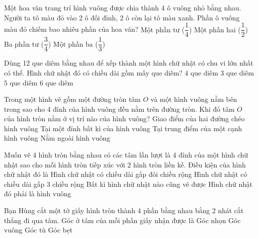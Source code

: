 \begin{ex} %
Một hoa văn trang trí hình vuông được chia thành 4 ô vuông nhỏ bằng nhau. Người ta tô màu đỏ vào 2 ô đối đỉnh, 2 ô còn lại tô màu xanh. Phần ô vuông màu đỏ chiếm bao nhiêu phần của hoa văn?
\choice
{Một phần tư ($\dfrac{1}{4}$)}
{\True Một phần hai ($\dfrac{1}{2}$)}
{Ba phần tư ($\dfrac{3}{4}$)}
{Một phần ba ($\dfrac{1}{3}$)}
\end{ex}

\begin{ex} %
Dùng 12 que diêm bằng nhau để xếp thành một hình chữ nhật có chu vi lớn nhất có thể. Hình chữ nhật đó có chiều dài gồm mấy que diêm?
\choice
{$4$ que diêm}
{$3$ que diêm}
{\True $5$ que diêm}
{$6$ que diêm}
\end{ex}

\begin{ex} %
Trong một hình vẽ gồm một đường tròn tâm $O$ và một hình vuông nằm bên trong sao cho 4 đỉnh của hình vuông đều nằm trên đường tròn. Khi đó tâm $O$ của hình tròn nằm ở vị trí nào của hình vuông?
\choice
{\True Giao điểm của hai đường chéo hình vuông}
{Tại một đỉnh bất kì của hình vuông}
{Tại trung điểm của một cạnh hình vuông}
{Nằm ngoài hình vuông}
\end{ex}

\begin{ex} %
Muốn vẽ 4 hình tròn bằng nhau có các tâm lần lượt là 4 đỉnh của một hình chữ nhật sao cho mỗi hình tròn tiếp xúc với 2 hình tròn liền kề. Điều kiện của hình chữ nhật đó là
\choice
{Hình chữ nhật có chiều dài gấp đôi chiều rộng}
{Hình chữ nhật có chiều dài gấp 3 chiều rộng}
{Bất kì hình chữ nhật nào cũng vẽ được}
{\True Hình chữ nhật đó phải là hình vuông}
\end{ex}

\begin{ex} %
Bạn Hùng cắt một tờ giấy hình tròn thành 4 phần bằng nhau bằng 2 nhát cắt thẳng đi qua tâm. Góc ở tâm của mỗi phần giấy nhận được là
\choice
{Góc nhọn}
{\True Góc vuông}
{Góc tù}
{Góc bẹt}
\end{ex}


